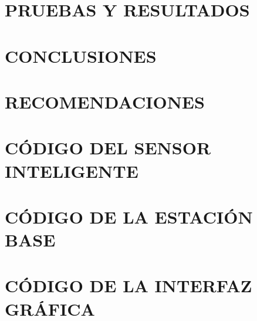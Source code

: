 \documentclass[letterpaper,titlepage,12pt,oneside,spanish,final]{report_eie}
\begin{document}
\chapter{PRUEBAS Y RESULTADOS}\label{CAP:pruebas}


\chapter{CONCLUSIONES}\label{CAP:conclu}


\chapter{RECOMENDACIONES}\label{CAP:recomendaciones}



\appendix

\renewcommand \thechapter{\Roman{chapter}}
\chapter{CÓDIGO DEL SENSOR INTELIGENTE}\label{CAP:anexo0}
%

\chapter{CÓDIGO DE LA ESTACIÓN BASE}\label{CAP:anexo1}


\chapter{CÓDIGO DE LA INTERFAZ GRÁFICA}\label{CAP:anexo2}
%



\end{document}
